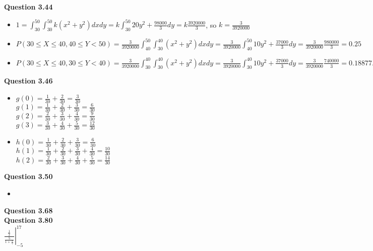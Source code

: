 \documentclass{article}
\begin{document}
    \textbf{Question 3.44}
    \begin{itemize}
        \item $1=\int_{30}^{50}\int_{30}^{50}k(x^2+y^2)dxdy = k\int_{30}^{50}20y^2+\frac{98000}{3}dy = k\frac{3920000}{3}$, so $k= \frac{3}{3920000}$
        \item $P(30\leq X \leq 40, 40\leq Y < 50) = \frac{3}{3920000}\int_{40}^{50}\int_{30}^{40}(x^2+y^2)dxdy = \frac{3}{3920000}\int_{40}^{50}10y^2+\frac{37000}{3}dy = \frac{3}{3920000}\frac{980000}{3} = 0.25$
        \item $P(30\leq X \leq 40, 30\leq Y < 40) = \frac{3}{3920000}\int_{30}^{40}\int_{30}^{40}(x^2+y^2)dxdy = \frac{3}{3920000}\int_{30}^{40}10y^2+\frac{37000}{3}dy = \frac{3}{3920000}\frac{740000}{3} = 0.18877...$
    \end{itemize}
    \textbf{Question 3.46}
    \begin{itemize}
        \item $g(0)=\frac{1}{30}+\frac{2}{30} = \frac{3}{30}$\\
              $g(1)=\frac{1}{30}+\frac{2}{30}+\frac{3}{30}=\frac{6}{30}$\\
              $g(2)=\frac{2}{30}+\frac{3}{30}+\frac{4}{30}=\frac{9}{30}$\\
              $g(3)=\frac{3}{30}+\frac{4}{30}+\frac{5}{30}=\frac{12}{30}$
        \item $h(0)=\frac{1}{30}+\frac{2}{30}+\frac{3}{30}=\frac{6}{30}$\\
              $h(1)=\frac{1}{30}+\frac{2}{30}+\frac{3}{30}+\frac{4}{30}=\frac{10}{30}$\\
              $h(2)=\frac{2}{30}+\frac{3}{30}+\frac{4}{30}+\frac{5}{30}=\frac{14}{30}$
    \end{itemize}
    \textbf{Question 3.50}
    \begin{itemize}
        \item 
    \end{itemize}
    \textbf{Question 3.68}\\
    \textbf{Question 3.80}\\

    $  \left.\frac{\frac{1}{x}}{\frac{5}{1+\frac{x}{7}}}\right\vert_{-5}^{17}$\\
    
\end{document}
